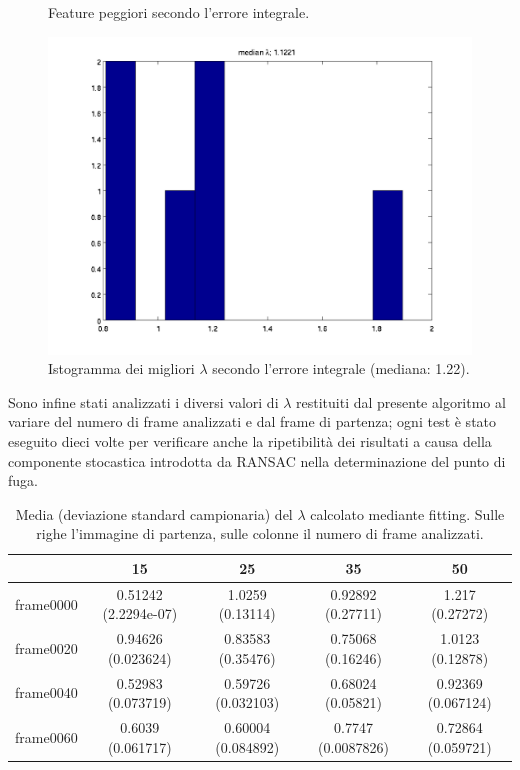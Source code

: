 \documentclass[12pt]{report}
\begin{document}
\begin{figure}[H]
\begin{minipage}[t]{0.5\linewidth}
\end{minipage}
\caption[short]{Feature peggiori secondo l'errore integrale.}
\label{fig:worstIntErr}
\end{figure}


\begin{figure}[H]
	\centering
	\includegraphics[scale=.5]{images/intErrhistLamFit}
	\caption{Istogramma dei migliori $\lambda$ secondo l'errore integrale (mediana: 1.22).}
	\label{fig:intErrHist}
\end{figure}

\noindent Sono infine stati analizzati i diversi valori di $\lambda$ restituiti dal presente algoritmo al variare del numero di frame analizzati e dal frame di partenza; ogni test \`e stato eseguito dieci volte per verificare anche la ripetibilit\`a dei risultati a causa della componente stocastica introdotta da RANSAC nella determinazione del punto di fuga.\\

\begin{table}[H]
\begin{center}
\begin{tabular}{|c|c|c|c|c|}
	\hline
	& 15 & 25 & 35 & 50 \\
	\hline
	frame0000 & 0.51242 (2.2294e-07) & 1.0259 (0.13114) & 0.92892 (0.27711) & 1.217 (0.27272)\\ \hline
	frame0020 & 0.94626 (0.023624) & 0.83583 (0.35476) & 0.75068 (0.16246) & 1.0123 (0.12878)\\ \hline
	frame0040 & 0.52983 (0.073719) & 0.59726 (0.032103) & 0.68024 (0.05821) & 0.92369 (0.067124)\\ \hline
	frame0060 & 0.6039 (0.061717) & 0.60004 (0.084892) & 0.7747 (0.0087826) & 0.72864 (0.059721)\\ \hline
\end{tabular}
\caption{Media (deviazione standard campionaria) del $\lambda$ calcolato mediante fitting. Sulle righe l'immagine di partenza, sulle colonne il numero di frame analizzati.}
\label{tabFit}
\end{center}
\end{table}
\end{document}
